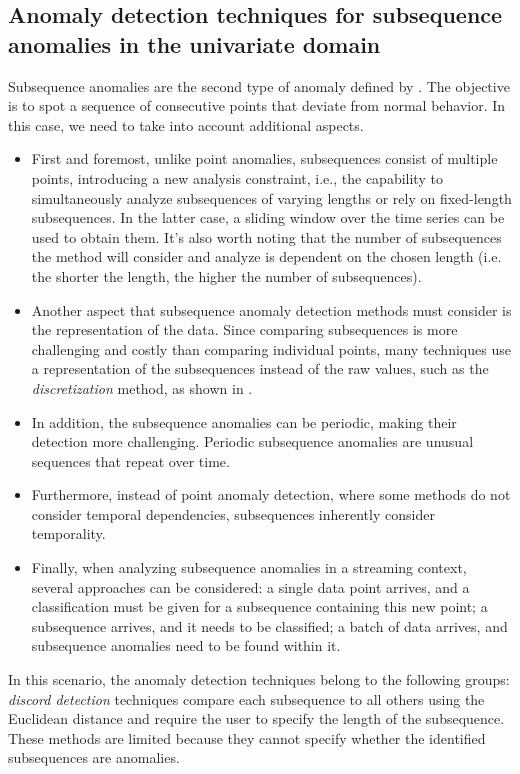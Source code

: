 \subsection{Anomaly detection techniques for subsequence anomalies in the univariate domain}
\label{ss:ad-subsequence-univariate}
Subsequence anomalies are the second type of anomaly defined by \cite{chandola_2019}. The objective is to spot a sequence of consecutive points that deviate from normal behavior. In this case, we need to take into account additional aspects. 
\begin{itemize}
    \item First and foremost, unlike point anomalies, subsequences consist of multiple points, introducing a new analysis constraint, i.e., the capability to simultaneously analyze subsequences of varying lengths or rely on fixed-length subsequences. In the latter case, a sliding window over the time series can be used to obtain them. It's also worth noting that the number of subsequences the method will consider and analyze is dependent on the chosen length (i.e. the shorter the length, the higher the number of subsequences). 
    \item Another aspect that subsequence anomaly detection methods must consider is the representation of the data. Since comparing subsequences is more challenging and costly than comparing individual points, many techniques use a representation of the subsequences instead of the raw values, such as the \textit{discretization} method, as shown in \cite{Chandola_2012}.
    \item In addition, the subsequence anomalies can be periodic, making their detection more challenging. Periodic subsequence anomalies are unusual sequences that repeat over time.
    \item Furthermore, instead of point anomaly detection, where some methods do not consider temporal dependencies, subsequences inherently consider temporality.
    \item Finally, when analyzing subsequence anomalies in a streaming context, several approaches can be considered: a single data point arrives, and a classification must be given for a subsequence containing this new point; a subsequence arrives, and it needs to be classified; a batch of data arrives, and subsequence anomalies need to be found within it.
\end{itemize}
In this scenario, the anomaly detection techniques belong to the following groups: 
\textit{discord detection} techniques compare each subsequence to all others using the Euclidean distance and require the user to specify the length of the subsequence. These methods are limited because they cannot specify whether the identified subsequences are anomalies. 
